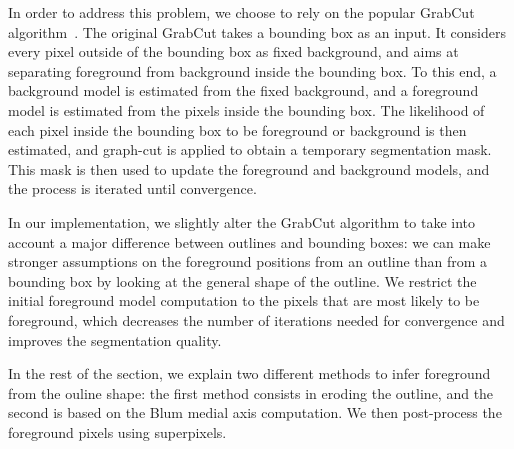 In order to address this problem, we choose to rely on the popular
GrabCut algorithm~\cite{rother_grabcut:_2004}.
The original GrabCut takes a bounding box as an input.
It considers every pixel outside of the bounding box as fixed background,
and aims at separating foreground from background inside the bounding box.
To this end, a background model is estimated from the fixed background,
and a foreground model is estimated from the pixels
inside the bounding box.
The likelihood of each pixel inside the bounding box
to be foreground or background is then estimated,
and graph-cut is applied to obtain a temporary segmentation mask.
This mask is then used to update the foreground and background models,
and the process is iterated until convergence.


In our implementation, we slightly alter the GrabCut algorithm to take
into account a major difference between outlines and bounding boxes:
we can make stronger assumptions on the foreground positions
from an outline than from a bounding box
by looking at the general shape of the outline.
We restrict the initial foreground model computation to the pixels
that are most likely to be foreground,
which decreases the number of iterations needed for convergence
and improves the segmentation quality.


In the rest of the section, we explain two different methods
to infer foreground from the ouline shape:
the first method consists in eroding the outline,
and the second is based on the Blum medial axis computation.
We then post-process the foreground pixels using superpixels.


